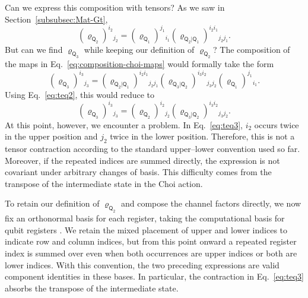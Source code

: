 \documentclass[
    aps,
    pra,
    reprint,
    superscriptaddress,
    nofootinbib
]{revtex4-2}
\theoremstyle{definition}
\theoremstyle{plain}
\begin{document}
Can we express this composition with tensors? As we saw in
Section~\ref{subsubsec:Mat-Gt},
\begin{equation}
    \left(\varrho_{\mathsf{Q}_{2}}\right)^{i_{2}}{}_{j_{2}}
    =
    \left(\varrho_{\mathsf{Q}_{1}}\right)^{j_{1}}{}_{i_{1}}
    \left(\varrho_{\mathsf{Q}_{2}|\mathsf{Q}_{1}}\right)
    ^{i_{2}i_{1}}{}_{j_{2}j_{1}}.
    \label{eq:teq2}
\end{equation}
But can we find $\varrho_{\mathsf{Q}_{3}}$ while keeping our definition
of $\varrho_{\mathsf{Q}_{2}}$? The composition of the maps in
Eq.~\eqref{eq:composition-choi-maps} would formally take the form
\begin{equation}
    \left(\varrho_{\mathsf{Q}_{3}}\right)^{i_{3}}{}_{j_{3}}=
    \left(\varrho_{\mathsf{Q}_{2}|\mathsf{Q}_{1}}\right)
    ^{i_{2}i_{1}}{}_{j_{2}j_{1}}
    \left(\varrho_{\mathsf{Q}_{3}|\mathsf{Q}_{2}}\right)
    ^{i_{3}i_{2}}{}_{j_{3}j_{2}}
    \left(\varrho_{\mathsf{Q}_{1}}\right)^{j_{1}}{}_{i_{1}}.
\end{equation}
Using Eq.~\eqref{eq:teq2}, this would reduce to
\begin{equation}
    \left(\varrho_{\mathsf{Q}_{3}}\right)^{i_{3}}{}_{j_{3}}
    =
    \left(\varrho_{\mathsf{Q}_{2}}\right)^{i_{2}}{}_{j_{2}}
    \left(\varrho_{\mathsf{Q}_{3}|\mathsf{Q}_{2}}\right)
    ^{i_{3}i_{2}}{}_{j_{3}j_{2}}.
    \label{eq:teq3}
\end{equation}
At this point, however, we encounter a problem. In
Eq.~\eqref{eq:teq3}, $i_{2}$ occurs twice in the upper position and
$j_{2}$ twice in the lower position. Therefore, this is not a tensor
contraction according to the standard upper--lower convention used so
far. Moreover, if the repeated indices are summed directly, the
expression is not covariant under arbitrary changes of basis. This
difficulty comes from the transpose of the intermediate state in the
Choi action.

To retain our definition of $\varrho_{\mathsf{Q}_{2}}$ and compose the
channel factors directly, we now fix an orthonormal basis for each register,
taking the computational basis for qubit registers
\cite[Secs.~6.1--6.3]{DullemondPeeters2010}. We retain the mixed
placement of upper and lower indices to indicate row and column indices,
but from this point onward a repeated register index is summed over even
when both occurrences are upper indices or both are lower indices.
With this convention, the two preceding expressions are valid component
identities in these bases. In
particular, the contraction in Eq.~\eqref{eq:teq3} absorbs the transpose
of the intermediate state.
\end{document}
